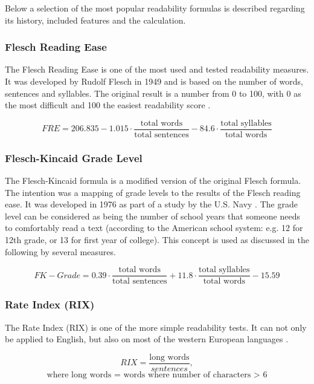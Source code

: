 \documentclass[runningheads,a4paper]{llncs}
\begin{document}
Below a selection of the most popular readability formulas is described regarding its history, included features and the calculation.


\subsubsection{Flesch Reading Ease}
The Flesch Reading Ease is one of the most used and tested readability measures. It was developed by Rudolf Flesch in 1949 and is based on the number of words, sentences and syllables.
The original result is a number from 0 to 100, with 0 as the most difficult and 100 the easiest readability score \cite{Dubay2004}.

 \begin{equation} FRE = 206.835 - 1.015 \cdot \frac{\text{total words}}{\text{total sentences}} - 84.6 \cdot \frac{\text{total syllables}}{\text{total words}} \end{equation}
 
 
 \subsubsection{Flesch-Kincaid Grade Level}
 
 The Flesch-Kincaid formula is a modified version of the original Flesch formula. The intention was a mapping of grade levels to the results of the Flesch reading ease. It was developed in 1976 as part of a study by the U.S. Navy \cite{Dubay2004}. The grade level can be considered as being the number of school years that someone needs to comfortably read a text (according to the American school system: e.g. 12 for 12th grade, or 13 for first year of college). This concept is used as discussed in the following by several measures.
 
 \begin{equation}FK-Grade = 0.39 \cdot \frac{\text{total words}}{\text{total sentences}} + 11.8 \cdot \frac{\text{total syllables}}{\text{total words}} - 15.59 \end{equation}

 
\subsubsection{Rate Index (RIX)}
The Rate Index (RIX)  is one of the more simple readability tests. It can not only be applied to English, but also on most of the western European languages \cite{webmining2007}.

 \begin{equation} RIX = \frac{\text{long words}}{sentences},\end{equation}
 \begin{equation*}
 \text{where long words = words where number of characters $>$ 6}
 \end{equation*}
 
\end{document}
